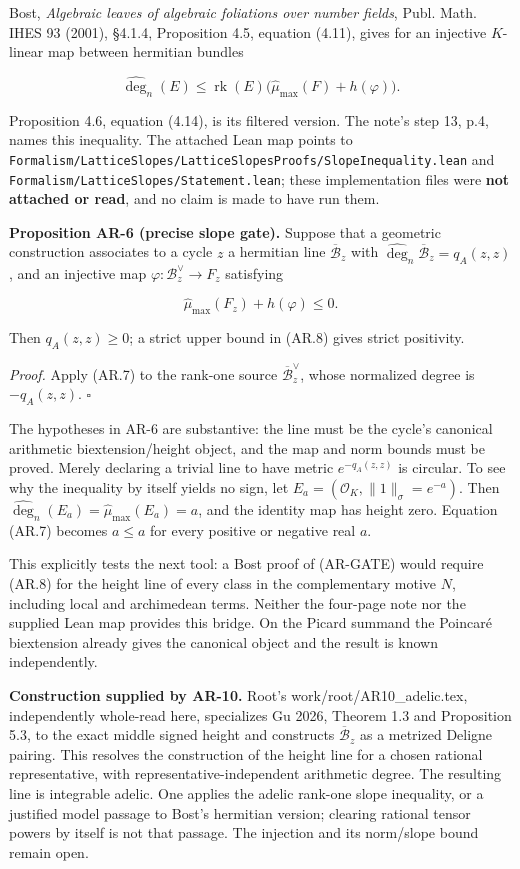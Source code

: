 Bost, \emph{Algebraic leaves of algebraic foliations over number
fields}, Publ. Math. IHES 93 (2001), §4.1.4, Proposition 4.5, equation
(4.11), gives for an injective \(K\)-linear map between hermitian
bundles

\[
\widehat{\deg}_{n}(E)
\le\operatorname{rk}(E)\bigl(\widehat\mu_{\max}(F)+h(\varphi)\bigr).
\tag{AR.7}
\]

Proposition 4.6, equation (4.14), is its filtered version. The note's
step 13, p.4, names this inequality. The attached Lean map points to
\texttt{Formalism/LatticeSlopes/LatticeSlopesProofs/SlopeInequality.lean}
and \texttt{Formalism/LatticeSlopes/Statement.lean}; these
implementation files were \textbf{not attached or read}, and no claim is
made to have run them.

\textbf{Proposition AR-6 (precise slope gate).} Suppose that a geometric
construction associates to a cycle \(z\) a hermitian line
\(\overline{\mathcal B}_z\) with
\(\widehat{\deg}_n\overline{\mathcal B}_z=q_A(z,z)\), and an injective
map \(\varphi:\mathcal B_z^\vee\to F_z\) satisfying

\[
\widehat\mu_{\max}(F_z)+h(\varphi)\le0.
\tag{AR.8}
\]

Then \(q_A(z,z)\ge0\); a strict upper bound in (AR.8) gives strict
positivity.

\emph{Proof.} Apply (AR.7) to the rank-one source
\(\overline{\mathcal B}_z^\vee\), whose normalized degree is
\(-q_A(z,z)\). \(\square\)

The hypotheses in AR-6 are substantive: the line must be the cycle's
canonical arithmetic biextension/height object, and the map and norm
bounds must be proved. Merely declaring a trivial line to have metric
\(e^{-q_A(z,z)}\) is circular. To see why the inequality by itself
yields no sign, let \(E_a=(\mathcal O_K,\|1\|_\sigma=e^{-a})\). Then
\(\widehat{\deg}_n(E_a)=\widehat\mu_{\max}(E_a)=a\), and the identity
map has height zero. Equation (AR.7) becomes \(a\le a\) for every
positive or negative real \(a\).

This explicitly tests the next tool: a Bost proof of (AR-GATE) would
require (AR.8) for the height line of every class in the complementary
motive \(N\), including local and archimedean terms. Neither the
four-page note nor the supplied Lean map provides this bridge. On the
Picard summand the Poincaré biextension already gives the canonical
object and the result is known independently.

\textbf{Construction supplied by AR-10.} Root's
work/root/AR10\_adelic.tex, independently whole-read here, specializes
Gu 2026, Theorem 1.3 and Proposition 5.3, to the exact middle signed
height and constructs \(\overline{\mathcal B}_z\) as a metrized Deligne
pairing. This resolves the construction of the height line for a chosen
rational representative, with representative-independent arithmetic
degree. The resulting line is integrable adelic. One applies the adelic
rank-one slope inequality, or a justified model passage to Bost's
hermitian version; clearing rational tensor powers by itself is not that
passage. The injection and its norm/slope bound remain open.

